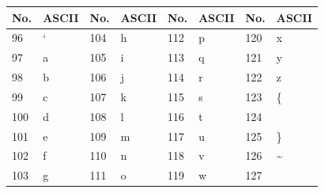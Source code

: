 \documentclass[10pt,landscape,twocolumn,a4paper,notitlepage]{article}
\begin{document}
		\begin{table}[H]
			\begin{tabular}{|l|l|l|l|l|l|l|l|}
				\hline \textbf{No.} & \textbf{ASCII} & \textbf{No.} & \textbf{ASCII}  &
					\textbf{No.} & \textbf{ASCII} & \textbf{No.} & \textbf{ASCII} \\ \hline
				96 & ` & 104 & h & 112 & p & 120 & x \\ \hline
				97 & a & 105 & i & 113 & q & 121 & y \\ \hline
				98 & b & 106 & j & 114 & r & 122 & z \\ \hline
				99 & c & 107 & k & 115 & s & 123 & \{ \\ \hline
				100 & d & 108 & l & 116 & t & 124 & \textbar \\ \hline
				101 & e & 109 & m & 117 & u & 125 & \} \\ \hline
				102 & f & 110 & n & 118 & v & 126 & \textasciitilde \\ \hline
				103 & g &  111 & o & 119 & w & 127 &  \\ \hline
			\end{tabular}
		\end{table}
		
\end{document}
